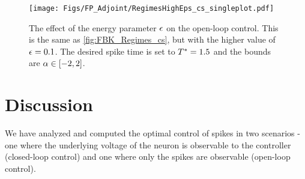 \begin{figure}[htp]
\begin{center}
  \texttt{[image: Figs/FP\_Adjoint/RegimesHighEps\_cs\_singleplot.pdf]}
  \caption[labelInTOC]{The effect of the energy parameter ${\epsilon}$ on the open-loop
  control. This is the same as \cref{fig:FBK_Regimes_cs}, but with the higher
  value of ${\epsilon} =0.1$. 
  The desired spike time is set to ${ T^* }=1.5$ and the bounds are $\alpha \in [-2,2]$.}
    \label{fig:FBK_Regimes_cs_different_es} 
\end{center}
\end{figure}

% 


\section{Discussion}
We have analyzed and computed the optimal control of spikes in two scenarios -
one where the underlying voltage of the neuron is observable to the controller
(closed-loop control) and one where only the spikes are observable (open-loop
control).

